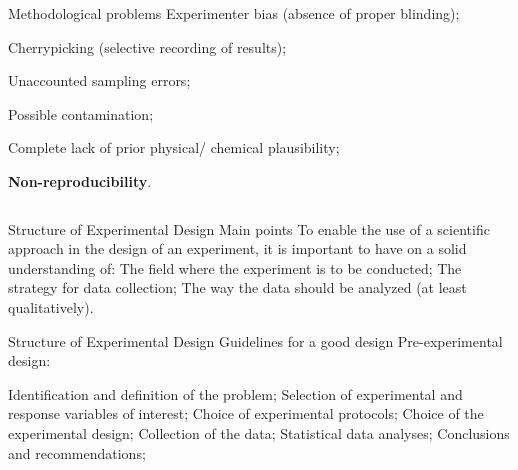 \documentclass[t]{beamer}
\begin{document}
\begin{ftst}
\begin{columns}
	\begin{block}{Methodological problems}
	\small
	\bitems Experimenter bias (absence of proper blinding);
		\item Cherrypicking (selective recording of results);
		\item Unaccounted sampling errors;
		\item Possible contamination;
		\item Complete lack of prior physical/ chemical plausibility;
		\item \textbf{Non-reproducibility}.
	\eitem
\end{block}
\end{columns}
\end{ftst}


\begin{ftst}
{Structure of Experimental Design}
{Main points}
To enable the use of a scientific approach in the design of an experiment, it is important to have on a solid understanding of:
\vhalf
\bitems The field where the experiment is to be conducted;
	\spitem The strategy for data collection;
	\spitem The way the data should be analyzed (at least qualitatively).
\eitem
\end{ftst}


\begin{ftst}
{Structure of Experimental Design}
{Guidelines for a good design}
\bitems Pre-experimental design:

	\bitems Identification and definition of the problem;
		\spitem Selection of experimental and response variables of interest;
		\spitem Choice of experimental protocols;
	\eitem
	\spitem Choice of the experimental design;
	\spitem Collection of the data;
	\spitem Statistical data analyses;
	\spitem Conclusions and recommendations;
\eitem
\end{ftst}

\end{document}
